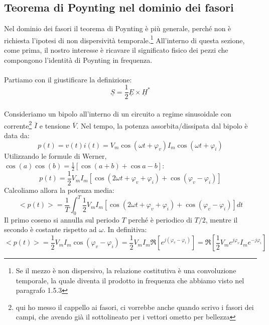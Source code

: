 \documentclass{book}
\begin{document}
    \subsection{Teorema di Poynting nel dominio dei fasori}
        Nel dominio dei fasori il teorema di Poynting è più generale, perché non è richiesta l'ipotesi di non dispersività
        temporale.\footnote{Se il mezzo è non dispersivo, la relazione costitutiva è una convoluzione temporale, la quale diventa il prodotto
        in frequenza che abbiamo visto nel paragrafo 1.5.3} All'interno di questa sezione, come prima, il nostro interesse
        è ricavare il significato fisico dei pezzi che compongono l'identità di Poynting in frequenza. 
        \\ \\ Partiamo con il giustificare la definizione:
        \begin{equation}
            \underline{S} = \frac{1}{2}\underline{E} \times \underline{H}^{*}
        \end{equation} \\
        Consideriamo un bipolo all'interno di un circuito a regime sinusoidale con corrente\footnote{qui ho messo il cappello ai fasori, ci vorrebbe anche
        quando scrivo i fasori dei campi, che avendo già il sottolineato per i vettori ometto per bellezza} $\overline{I}$
        e tensione $\overline{V}$. Nel tempo, la potenza assorbita/dissipata dal bipolo è data da:
        \begin{equation}
            p(t) = v(t)i(t)=V_{m}\cos{(\omega t + \varphi_{v})}I_{m}\cos{(\omega t + \varphi_{i})}
        \end{equation}
        Utilizzando le formule di Werner, $\cos{(a)}\cos{(b)} = \frac{1}{2}[\cos{(a+b)}+\cos{a-b}]$:
        \begin{equation}
            p(t) = \frac{1}{2}V_{m}I_{m}[\cos{(2\omega t + \varphi_{v}+\varphi_{i})}+\cos{( \varphi_{v}-\varphi_{i})}]
        \end{equation}
        Calcoliamo allora la potenza media:
        \begin{equation}
            <p(t)> = \frac{1}{T} \int_{0} ^{T} \frac{1}{2}V_{m}I_{m}[\cos{(2\omega t + \varphi_{v}+\varphi_{i})}+\cos{( \varphi_{v}-\varphi_{i})}] dt
        \end{equation}
        Il primo coseno si annulla sul periodo $T$ perché è periodico di $T/2$, mentre il secondo è costante rispetto ad $\omega$. In definitiva:
        \begin{equation}
            <p(t)>=\frac{1}{2}V_{m}I_{m}\cos{(\varphi_{v}-\varphi_{i})} = \frac{1}{2}V_{m}I_{m}\Re[e^{j(\varphi_{v}-\varphi_{i})}] = \Re[\frac{1}{2}V_{m}e^{j\varphi_{v}}I_{m}e^{-j\varphi_{i}}]
        \end{equation}
\end{document}
